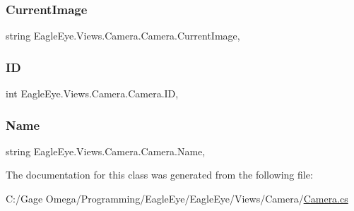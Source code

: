 \subsubsection{\texorpdfstring{CurrentImage}{CurrentImage}}
{\footnotesize\ttfamily string Eagle\+Eye.\+Views.\+Camera.\+Camera.\+Current\+Image\hspace{0.3cm}{\ttfamily [get]}, {\ttfamily [set]}}

\mbox{\label{class_eagle_eye_1_1_views_1_1_camera_1_1_camera_adde1c217f5dec95f622165afd7f1af16}} 
\subsubsection{\texorpdfstring{ID}{ID}}
{\footnotesize\ttfamily int Eagle\+Eye.\+Views.\+Camera.\+Camera.\+ID\hspace{0.3cm}{\ttfamily [get]}, {\ttfamily [set]}}

\mbox{\label{class_eagle_eye_1_1_views_1_1_camera_1_1_camera_aac0993dea066c34a044f51f23194551c}} 
\subsubsection{\texorpdfstring{Name}{Name}}
{\footnotesize\ttfamily string Eagle\+Eye.\+Views.\+Camera.\+Camera.\+Name\hspace{0.3cm}{\ttfamily [get]}, {\ttfamily [set]}}



The documentation for this class was generated from the following file\+:\begin{DoxyCompactItemize}
\item 
C\+:/\+Gage Omega/\+Programming/\+Eagle\+Eye/\+Eagle\+Eye/\+Views/\+Camera/\mbox{\hyperlink{_views_2_camera_2_camera_8cs}{Camera.\+cs}}\end{DoxyCompactItemize}
